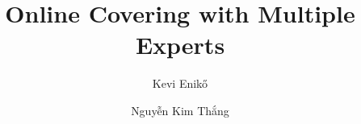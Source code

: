 \documentclass[11pt,a4paper]{article}
\begin{document}
\title{Online Covering with Multiple Experts}

\author{Kevi Enik\H{o}}
\author{Nguyễn Kim Thắng}

\maketitle







\clearpage




\clearpage

\appendix



\end{document}
